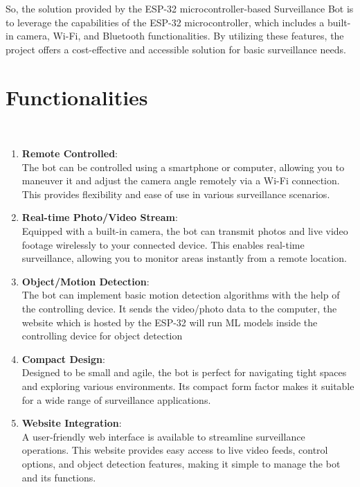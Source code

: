 \documentclass[12pt]{article}
\begin{document}
So, the solution provided by the ESP-32 microcontroller-based Surveillance Bot is to leverage the capabilities of the ESP-32 microcontroller, which includes a built-in camera, Wi-Fi, and Bluetooth functionalities. By utilizing these features, the project offers a cost-effective and accessible solution for basic surveillance needs.

\newpage
\section{Functionalities}\\
\begin{enumerate}
\newline
    \item \textbf{Remote Controlled}:\\

    The bot can be controlled using a smartphone or computer, allowing you to maneuver it and adjust the camera angle remotely via a Wi-Fi connection. This provides flexibility and ease of use in various surveillance scenarios.\\
    \item \textbf{Real-time Photo/Video Stream}:\\

    Equipped with a built-in camera, the bot can transmit photos and live video footage wirelessly to your connected device. This enables real-time surveillance, allowing you to monitor areas instantly from a remote location.\\
    \item \textbf{Object/Motion Detection}:\\

    The bot can implement basic motion detection algorithms with the help of the controlling device. It sends the video/photo data to the computer, the website which is hosted by the ESP-32 will run ML models inside the controlling device for object detection\\
    \item \textbf{Compact Design}:\\
    
    Designed to be small and agile, the bot is perfect for navigating tight spaces and exploring various environments. Its compact form factor makes it suitable for a wide range of surveillance applications.\\
    \item \textbf{Website Integration}:\\
    
    A user-friendly web interface is available to streamline surveillance operations. This website provides easy access to live video feeds, control options, and object detection features, making it simple to manage the bot and its functions.\\
\end{enumerate}
\newpage
\end{document}
